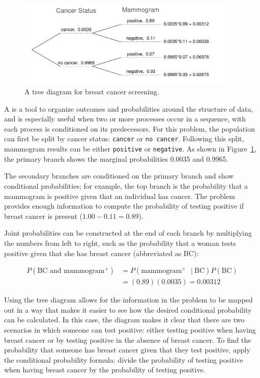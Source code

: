 \begin{figure}[h]
	\centering
	\includegraphics[width=0.93\textwidth]{ch_probability_oi_biostat/figures/BreastCancerTreeDiagram/BreastCancerTreeDiagram}
	\caption{A tree diagram for breast cancer screening.}
	\label{BreastCancerTreeDiagram}
\end{figure}

A  is a tool to organize outcomes and probabilities around the structure of data, and is especially useful when two or more processes occur in a sequence, with each process is conditioned on its predecessors. For this problem, the population can first be split by cancer status: \texttt{cancer} or \texttt{no cancer}. Following this split, mammogram results can be either \texttt{positive} or \texttt{negative}. As shown in Figure~\ref{BreastCancerTreeDiagram}, the primary branch shows the marginal probabilities 0.0035 and 0.9965. 

The secondary branches are conditioned on the primary branch and show conditional probabilities; for example, the top branch is the probability that a mammogram is positive given that an individual has cancer. The problem provides enough information to compute the probability of testing positive if breast cancer is present ($1.00 - 0.11=0.89$). 

Joint probabilities can be constructed at the end of each branch by multiplying the numbers from left to right, such as the probability that a woman tests positive given that she has breast cancer (abbreviated as BC):

\begin{align*}
P(\text{BC and mammogram$^+$}) &= P(\text{mammogram$^+$ } |\ \text{BC})  P(\text{BC}) \\
	&= (0.89) (0.0035) = 0.00312
\end{align*}

Using the tree diagram allows for the information in the problem to be mapped out in a way that makes it easier to see how the desired conditional probability can be calculated. In this case, the diagram makes it clear that there are two scenarios in which someone can test positive: either testing positive when having breast cancer or by testing positive in the absence of breast cancer. To find the probability that someone has breast cancer given that they test positive, apply the conditional probability formula: divide the probability of testing positive when having breast cancer by the probability of testing positive.

